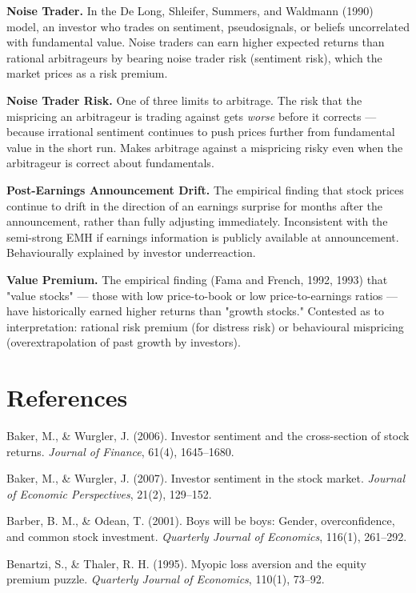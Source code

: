 \documentclass[12pt, letterpaper]{article}
\begin{document}
\textbf{Noise Trader.} In the De Long, Shleifer, Summers, and Waldmann (1990) model, an investor who trades on sentiment, pseudosignals, or beliefs uncorrelated with fundamental value. Noise traders can earn higher expected returns than rational arbitrageurs by bearing noise trader risk (sentiment risk), which the market prices as a risk premium.

\textbf{Noise Trader Risk.} One of three limits to arbitrage. The risk that the mispricing an arbitrageur is trading against gets \textit{worse} before it corrects --- because irrational sentiment continues to push prices further from fundamental value in the short run. Makes arbitrage against a mispricing risky even when the arbitrageur is correct about fundamentals.

\textbf{Post-Earnings Announcement Drift.} The empirical finding that stock prices continue to drift in the direction of an earnings surprise for months after the announcement, rather than fully adjusting immediately. Inconsistent with the semi-strong EMH if earnings information is publicly available at announcement. Behaviourally explained by investor underreaction.

\textbf{Value Premium.} The empirical finding (Fama and French, 1992, 1993) that "value stocks" --- those with low price-to-book or low price-to-earnings ratios --- have historically earned higher returns than "growth stocks." Contested as to interpretation: rational risk premium (for distress risk) or behavioural mispricing (overextrapolation of past growth by investors).

\medskip


\section*{References}


Baker, M., \& Wurgler, J. (2006). Investor sentiment and the cross-section of stock returns. \textit{Journal of Finance}, 61(4), 1645--1680.

Baker, M., \& Wurgler, J. (2007). Investor sentiment in the stock market. \textit{Journal of Economic Perspectives}, 21(2), 129--152.

Barber, B. M., \& Odean, T. (2001). Boys will be boys: Gender, overconfidence, and common stock investment. \textit{Quarterly Journal of Economics}, 116(1), 261--292.

Benartzi, S., \& Thaler, R. H. (1995). Myopic loss aversion and the equity premium puzzle. \textit{Quarterly Journal of Economics}, 110(1), 73--92.
\end{document}
